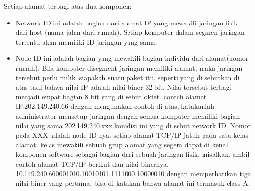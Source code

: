 Setiap alamat terbagi atas dua komponen:
\begin{itemize}
  \item Network ID
        ini adalah bagian dari alamat IP yang mewakili jaringan fisik dari host (nama jalan dari rumah). Setiap komputer dalam segmen jaringan tertentu akan memiliki ID jaringan yang sama.
  \item Node ID
        ini adalah bagian yang mewakili bagian individu dari alamat(nomor rumah). Bila komputer disegment jaringan memiliki alamat, maka jaringan tersebut perlu miliki siapakah suatu paket itu.
        seperti yang di sebutkan di atas tadi bahwa nilai IP adalah nilai biner 32 bit. Nilai tersebut terbagi menjadi empat bagian 8 bit yang di sebut oktet. contoh alamat IP:202.149.240.66 dengan mengunakan contoh di atas, katakanlah administrator mensetup jaringan dengan semua komputer memiliki bagian nilai yang sama 202.149.240.xxx.konidisi ini yang di sebut network ID. Nomor pada XXX adalah node ID-nya.
        setiap alamat TCP/IP jatuh pada satu kelas alamat. kelas mewakili sebuah grup alamat yang segera dapat di kenal komponen software sebagai bagian dari sebuah jaringan fisik.
        misalkan, ambil contoh alamat TCP/IP berikut dan nilai binernya. 10.149.240.660001010.10010101.1111000.10000010 dengan memperhatikan tiga nilai biner yang pertama, bisa di katakan bahwa alamat ini termasuk class A.
\end{itemize}
